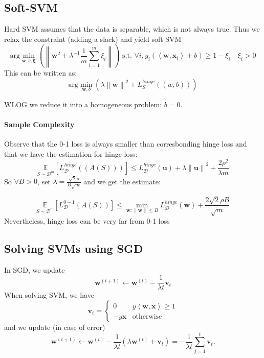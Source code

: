 \documentclass{book}
\newcommand{\D}{\mathcal{D}}
\begin{document}
\subsection{Soft-SVM}
Hard SVM assumes that the data is separable, which is not always true. Thus we relax the constraint (adding a slack) and yield soft SVM
\begin{equation*}
\mathrm{arg}\min_{\mathbf{w}, b, \mathbf{\xi}}\left( \left\|\mathbf{w}^2+ \lambda^{-1}\frac{1}{m}\sum\limits_{i=1}^m \xi_i\right\| \right) \text{ s.t. } \forall i, y_i \left( \left\langle \mathbf{w}, \mathbf{x}_i \right\rangle +b\right)\geq 1-\xi_i \quad \xi_i>0
\end{equation*}
This can be written as:
\begin{equation*}
\mathrm{arg}\min_{\mathbf{w},b}\left( \lambda \left\|\mathbf{w}\right\|^2+L_{S}^{hinge}((w,b))\right)
\end{equation*}

WLOG we reduce it into a homogeneous problem: $b=0$.

\paragraph{Sample Complexity}
Observe that the 0-1 loss is always smaller than corresbonding hinge loss and that we have the estimation for hinge loss:
\begin{equation*}
\underset{S\sim \D^{m}}{\mathbb{E}}\left[ L_{\D}^{hinge}\left( (A(S))\right)\right]\leq L_{\D}^{hinge}\left( \mathbf{u}\right)+\lambda \left\|\mathbf{u}\right\|^2 +\frac{2\rho^2}{\lambda m}
\end{equation*}
So $\forall B>0$, set $\lambda=\frac{\sqrt{2}\rho}{B \sqrt{m}}$ and we get the estimate:

\begin{equation*}
\underset{S\sim \D^m}{\mathbb{E}}\left[ L_{\D}^{0-1}(A(S))\right]\leq \min_{\mathbf{w}:\left\|\mathbf{w}\right\|\leq B}L_{\D}^{hinge}(\mathbf{w})+\frac{2 \sqrt{2} \rho B}{\sqrt{m}} 
\end{equation*}
Nevertheless, hinge loss can be very far from 0-1 loss

\subsection{Solving SVMs using SGD}
In SGD, we update
\begin{equation*}
\mathbf{w}^{(t+1)}\leftarrow \mathbf{w}^{(t)}-\frac{1}{\lambda t}\mathbf{v}_t
\end{equation*}
When solving SVM, we have
\begin{equation*}
\mathbf{v}_t=
\begin{cases}
  0 &y \left\langle \mathbf{w}, \mathbf{x} \right\rangle\geq 1\\ -y \mathbf{x} & \text{otherwise}
\end{cases}
\end{equation*}
and we update (in case of error)
\begin{equation*}
\mathbf{w}^{(t+1)}\leftarrow \mathbf{w}^{(t)}-\frac{1}{\lambda t}(\lambda \mathbf{w}^{(t)} +\mathbf{v}_t)=-\frac{1}{\lambda t}\sum\limits_{j=1}^t \mathbf{v}_t.
\end{equation*}
\end{document}
